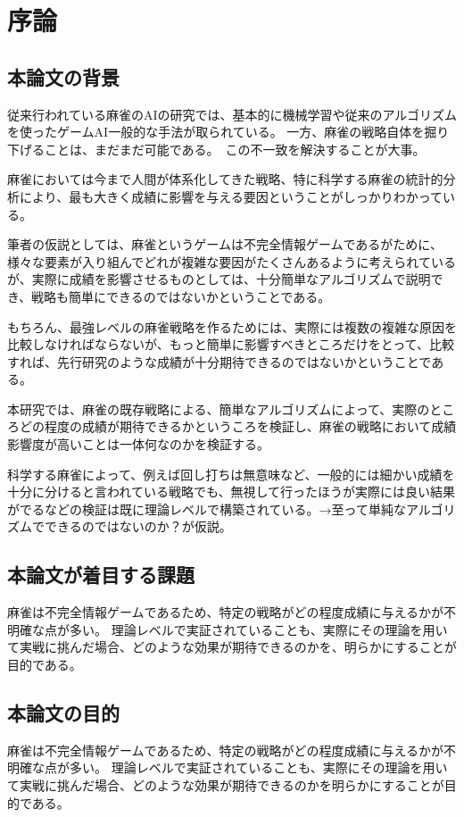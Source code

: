 \chapter{序論}
\label{chap:introduction}

\section{本論文の背景}
従来行われている麻雀のAIの研究では、基本的に機械学習や従来のアルゴリズムを使ったゲームAI一般的な手法が取られている。
一方、麻雀の戦略自体を掘り下げることは、まだまだ可能である。　この不一致を解決することが大事。

麻雀においては今まで人間が体系化してきた戦略、特に科学する麻雀の統計的分析により、最も大きく成績に影響を与える要因ということがしっかりわかっている。

筆者の仮説としては、麻雀というゲームは不完全情報ゲームであるがために、様々な要素が入り組んでどれが複雑な要因がたくさんあるように考えられているが、実際に成績を影響させるものとしては、十分簡単なアルゴリズムで説明でき、戦略も簡単にできるのではないかということである。

もちろん、最強レベルの麻雀戦略を作るためには、実際には複数の複雑な原因を比較しなければならないが、もっと簡単に影響すべきところだけをとって、比較すれば、先行研究のような成績が十分期待できるのではないかということである。

本研究では、麻雀の既存戦略による、簡単なアルゴリズムによって、実際のところどの程度の成績が期待できるかというころを検証し、麻雀の戦略において成績影響度が高いことは一体何なのかを検証する。

科学する麻雀によって、例えば回し打ちは無意味など、一般的には細かい成績を十分に分けると言われている戦略でも、無視して行ったほうが実際には良い結果がでるなどの検証は既に理論レベルで構築されている。→至って単純なアルゴリズムでできるのではないのか？が仮説。


\section{本論文が着目する課題}
麻雀は不完全情報ゲームであるため、特定の戦略がどの程度成績に与えるかが不明確な点が多い。
理論レベルで実証されていることも、実際にその理論を用いて実戦に挑んだ場合、どのような効果が期待できるのかを、明らかにすることが目的である。

\section{本論文の目的}
麻雀は不完全情報ゲームであるため、特定の戦略がどの程度成績に与えるかが不明確な点が多い。
理論レベルで実証されていることも、実際にその理論を用いて実戦に挑んだ場合、どのような効果が期待できるのかを明らかにすることが目的である。

